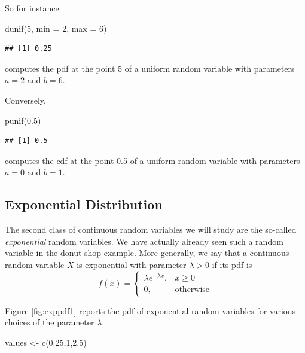 \documentclass[
]{book}
\newenvironment{Shaded}{\begin{snugshade}}{\end{snugshade}}
\newcommand{\AttributeTok}[1]{\textcolor[rgb]{0.77,0.63,0.00}{#1}}
\newcommand{\DecValTok}[1]{\textcolor[rgb]{0.00,0.00,0.81}{#1}}
\newcommand{\FloatTok}[1]{\textcolor[rgb]{0.00,0.00,0.81}{#1}}
\newcommand{\FunctionTok}[1]{\textcolor[rgb]{0.00,0.00,0.00}{#1}}
\newcommand{\NormalTok}[1]{#1}
\newcommand{\OtherTok}[1]{\textcolor[rgb]{0.56,0.35,0.01}{#1}}
\theoremstyle{definition}
\theoremstyle{definition}
\theoremstyle{definition}
\theoremstyle{definition}
\theoremstyle{remark}
\begin{document}
So for instance

\begin{Shaded}
\begin{Highlighting}[]
\FunctionTok{dunif}\NormalTok{(}\DecValTok{5}\NormalTok{, }\AttributeTok{min =} \DecValTok{2}\NormalTok{, }\AttributeTok{max =} \DecValTok{6}\NormalTok{)}
\end{Highlighting}
\end{Shaded}

\begin{verbatim}
## [1] 0.25
\end{verbatim}

computes the pdf at the point 5 of a uniform random variable with parameters \(a=2\) and \(b=6\).

Conversely,

\begin{Shaded}
\begin{Highlighting}[]
\FunctionTok{punif}\NormalTok{(}\FloatTok{0.5}\NormalTok{)}
\end{Highlighting}
\end{Shaded}

\begin{verbatim}
## [1] 0.5
\end{verbatim}

computes the cdf at the point 0.5 of a uniform random variable with parameters \(a=0\) and \(b=1\).

\hypertarget{exponential-distribution}{%
\subsection{Exponential Distribution}\label{exponential-distribution}}

The second class of continuous random variables we will study are the so-called \emph{exponential} random variables. We have actually already seen such a random variable in the donut shop example. More generally, we say that a continuous random variable \(X\) is exponential with parameter \(\lambda>0\) if its pdf is
\[
f(x) = \left\{
\begin{array}{ll}
\lambda e^{-\lambda x}, & x\geq 0\\
0, & \mbox{otherwise}
\end{array}
\right.
\]

Figure \ref{fig:exppdf1} reports the pdf of exponential random variables for various choices of the parameter \(\lambda\).

\begin{Shaded}
\begin{Highlighting}[]
\NormalTok{values }\OtherTok{\textless{}{-}} \FunctionTok{c}\NormalTok{(}\FloatTok{0.25}\NormalTok{,}\DecValTok{1}\NormalTok{,}\FloatTok{2.5}\NormalTok{)}
\end{Highlighting}
\end{Shaded}
\end{document}
